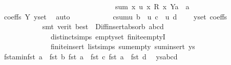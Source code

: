\begin{isabellebody}
\ \ \ \ \ \ \ \ \ \ \ \ \ \ \ \ \ \ \ \ \ \ \ \ \ \ \ \ \ \ \ \ {\isachardoublequoteopen}sum\ {\isacharparenleft}{\kern0pt}{\isasymlambda}x{\isachardot}{\kern0pt}\ u\ x\ {\isacharasterisk}{\kern0pt}\isactrlsub R\ x{\isacharparenright}{\kern0pt}\ {\isacharparenleft}{\kern0pt}Y{\isacharminus}{\kern0pt}{\isacharbraceleft}{\kern0pt}a{\isacharbraceright}{\kern0pt}{\isacharparenright}{\kern0pt}\ {\isacharequal}{\kern0pt}\ a{\isachardoublequoteclose}\isanewline
\ \ \ \ \ \ \ \ \ \ \isamarkupfalse%
\ coeffs\ Y{\isacharparenleft}{\kern0pt}{}{\isacharparenright}{\kern0pt}\ y{\isacharunderscore}{\kern0pt}set\ \isamarkupfalse%
\ auto\isanewline
\ \ \ \ \ \ \ \ \isamarkupfalse%
\ \isamarkupfalse%
\ c{\isacharunderscore}{\kern0pt}sum{\isacharcolon}{\kern0pt}{\isachardoublequoteopen}u\ b\ {\isacharplus}{\kern0pt}\ u\ c\ {\isacharplus}{\kern0pt}\ u\ d\ {\isacharequal}{\kern0pt}\ {}{\isachardoublequoteclose}\ \isamarkupfalse%
\ y{\isacharunderscore}{\kern0pt}set\ coeffs\isanewline
\ \ \ \ \ \ \ \ \ \ \isamarkupfalse%
\ {\isacharparenleft}{\kern0pt}smt\ {\isacharparenleft}{\kern0pt}verit{\isacharcomma}{\kern0pt}\ best{\isacharparenright}{\kern0pt}\ {\isachardoublequoteopen}{}{}{\isachardoublequoteclose}\ Diff{\isacharunderscore}{\kern0pt}insert{\isacharunderscore}{\kern0pt}absorb\ abcd\isanewline
\ \ \ \ \ \ \ \ \ \ \ \ \ \ distinct{\isachardot}{\kern0pt}simps{\isacharparenleft}{\kern0pt}{}{\isacharparenright}{\kern0pt}\ empty{\isacharunderscore}{\kern0pt}set\ finite{\isachardot}{\kern0pt}emptyI\isanewline
\ \ \ \ \ \ \ \ \ \ \ \ \ \ finite{\isacharunderscore}{\kern0pt}insert\ list{\isachardot}{\kern0pt}simps{\isacharparenleft}{\kern0pt}{}{}{\isacharparenright}{\kern0pt}\ sum{\isachardot}{\kern0pt}empty\ sum{\isachardot}{\kern0pt}insert\ ys{\isacharparenright}{\kern0pt}\isanewline
\ \ \ \ \ \ \ \ \isamarkupfalse%
\ fst{\isacharunderscore}{\kern0pt}a{\isacharunderscore}{\kern0pt}min{\isacharcolon}{\kern0pt}{\isachardoublequoteopen}fst\ a\ {\isacharless}{\kern0pt}\ fst\ b{\isachardoublequoteclose}\ {\isachardoublequoteopen}fst\ a\ {\isacharless}{\kern0pt}\ fst\ c{\isachardoublequoteclose}\ {\isachardoublequoteopen}fst\ a\ {\isacharless}{\kern0pt}\ fst\ d{\isachardoublequoteclose}\ \isamarkupfalse%
\ ys{\isacharunderscore}{\kern0pt}abcd\ {\isachardoublequoteopen}{}{\isachardoublequoteclose}\isanewline
\ \ \ \ \ \ \ \ \ \ \isamarkupfalse%

\end{isabellebody}
